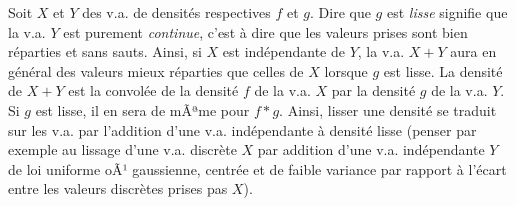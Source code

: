 {{\begin{eur}[Convolution des densités = addition d'un bruit indépendant sur la v.a.]
  Soit $X$ et $Y$ des v.a. de densités respectives $f$ et $g$.  Dire que $g$
  est \emph{lisse} signifie que la v.a. $Y$ est purement \emph{continue},
  c'est à dire que les valeurs prises sont bien réparties et sans sauts.
  Ainsi, si $X$ est indépendante de $Y$, la v.a. $X+Y$ aura en général des
  valeurs mieux réparties que celles de $X$ lorsque $g$ est lisse.  La densité
  de $X+Y$ est la convolée de la densité $f$ de la v.a. $X$ par la densité $g$
  de la v.a. $Y$.  Si $g$ est lisse, il en sera de mÃªme pour $f*g$.  Ainsi,
  lisser une densité se traduit sur les v.a. par l'addition d'une v.a.
  indépendante à densité lisse (penser par exemple au lissage d'une v.a.
  discrète $X$ par addition d'une v.a. indépendante $Y$ de loi uniforme oÃ¹
  gaussienne, centrée et de faible variance par rapport à l'écart entre les
  valeurs discrètes prises pas $X$).
\end{eur}

}}

